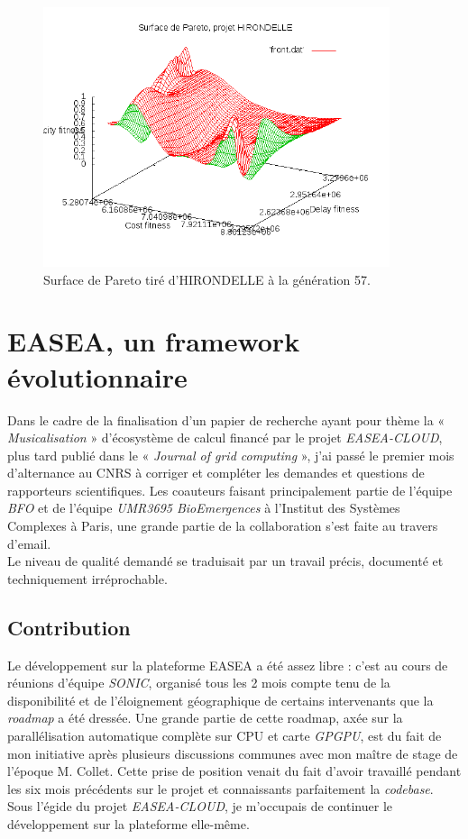 \documentclass[french, 11pt]{memoir}
\begin{document}
\begin{figure}[htbp]
	\begin{center}
		\includegraphics[width=4in]{img/paretoSurface.png}
		\caption{Surface de Pareto tiré d'HIRONDELLE à la génération 57.}
	\end{center}
\end{figure}

\section{EASEA, un framework évolutionnaire}

Dans le cadre de la finalisation d'un papier de recherche ayant pour
thème la « \emph{Musicalisation\cite{lutton2014visual}} » d'écosystème de calcul financé par le
projet \emph{EASEA-CLOUD}, plus tard publié dans le « \textit{Journal of grid
computing} », j'ai passé le premier mois d'alternance au CNRS à
corriger et compléter les demandes et questions de rapporteurs
scientifiques. Les coauteurs faisant principalement partie de l'équipe
\textit{BFO} et de l'équipe \emph{UMR3695 BioEmergences} à l'Institut des
Systèmes Complexes à Paris, une grande partie de la collaboration s'est
faite au travers d'email. \\
Le niveau de qualité demandé se traduisait par un travail précis,
documenté et techniquement irréprochable.

\subsection{Contribution}\label{contribution}

Le développement sur la plateforme EASEA a été assez libre : c'est au
cours de réunions d'équipe \emph{SONIC}, organisé tous les 2 mois compte
tenu de la disponibilité et de l'éloignement géographique de certains
intervenants que la \textit{roadmap} a été dressée. Une grande partie de cette
roadmap, axée sur la parallélisation automatique complète sur CPU et
carte \textit{GPGPU}, est du fait de mon initiative après plusieurs discussions
communes avec mon maître de stage de l'époque M. Collet. Cette prise de
position venait du fait d'avoir travaillé pendant les six mois
précédents sur le projet et connaissants parfaitement la
\emph{codebase}. \\
Sous l'égide du projet \emph{EASEA-CLOUD}, je m'occupais de continuer le
développement sur la plateforme elle-même.
\end{document}

